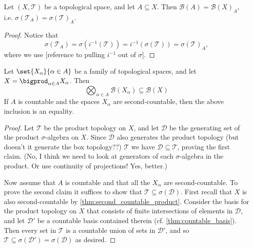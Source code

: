 \documentclass[article, a4paper, 11pt, oneside]{memoir}
\numberwithin{equation}{chapter}
\newcommand{\calT}{\mathcal{T}}
\newcommand{\calD}{\mathcal{D}}
\newcommand{\borel}{\mathcal{B}}
\begin{document}
\begin{proposition}
    Let $(X, \calT)$ be a topological space, and let $A \subseteq X$. Then $\borel(A) = \borel(X)_A$, i.e. $\sigma(\calT_A) = \sigma(\calT)_A$.
\end{proposition}

\begin{proof}
    Notice that
    \begin{equation*}
        \sigma(\calT_A)
            = \sigma(i^{-1}(\calT))
            = i^{-1}(\sigma(\calT))
            = \sigma(\calT)_A,
    \end{equation*}
    where we use [reference to pulling $i^{-1}$ out of $\sigma$].
\end{proof}



\begin{proposition}
    Let $\set{X_\alpha}{\alpha \in A}$ be a family of topological spaces, and let $X = \bigprod_{\alpha \in A} X_\alpha$. Then
    \begin{equation*}
        \bigotimes_{\alpha \in A} \borel(X_\alpha)
            \subseteq \borel(X)
    \end{equation*}
    If $A$ is countable and the spaces $X_\alpha$ are second-countable, then the above inclusion is an equality.
\end{proposition}

\begin{proof}
    Let $\calT$ be the product topology on $X$, and let $\calD$ be the generating set of the product $\sigma$-algebra on $X$. Since $\calD$ also generates the product topology (but doesn't it generate the box topology??) $\calT$ we have $\calD \subseteq \calT$, proving the first claim. (No, I think we need to look at generators of each $\sigma$-algebra in the product. Or use continuity of projections! Yes, better.)
    
    Now assume that $A$ is countable and that all the $X_\alpha$ are second-countable. To prove the second claim it suffices to show that $\calT \subseteq \sigma(\calD)$. First recall that $X$ is also second-countable by \cref{thm:second_countable_product}. Consider the basis for the product topology on $X$ that consists of finite intersections of elements in $\calD$, and let $\calD'$ be a countable basis contained therein (cf. \cref{thm:countable_basis}). Then every set in $\calT$ is a countable union of sets in $\calD'$, and so $\calT \subseteq \sigma(\calD') = \sigma(\calD)$ as desired.
\end{proof}


\nocite{*}

\printbibliography
\end{document}
